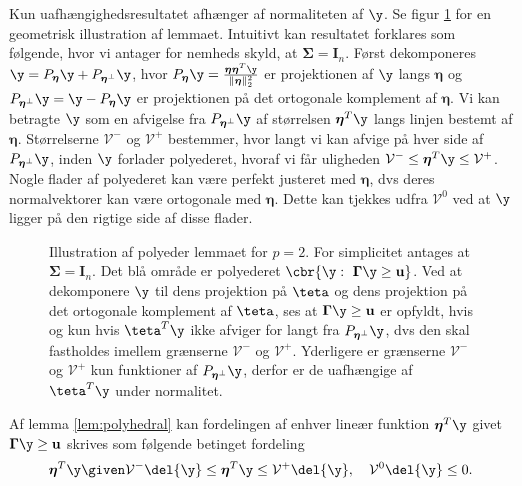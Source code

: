 Kun uafhængighedsresultatet afhænger af normaliteten af \(\y\).
Se figur \ref{fig:polyhedron} for en geometrisk illustration af lemmaet.
Intuitivt kan resultatet forklares som følgende, hvor vi antager for nemheds skyld, at \(\boldsymbol{\Sigma}= \mathbf{I}_n\).
Først dekomponeres \(\y=P_{\boldsymbol{\eta}} \y + P_{\boldsymbol{\eta}^\perp} \y\), hvor \(P_{\boldsymbol{\eta}} \y = \frac{\boldsymbol{\eta} \boldsymbol{\eta}^T \y}{\Vert \boldsymbol{\eta} \Vert_2^2}\) er projektionen af \(\y\) langs \(\boldsymbol{\eta}\) og \(P_{\boldsymbol{\eta}^\perp} \y = \y - P_{\boldsymbol{\eta}} \y\) er projektionen på det ortogonale komplement af \(\boldsymbol{\eta}\).
Vi kan betragte \(\y\) som en afvigelse fra \(P_{\boldsymbol{\eta}^\perp} \y\) af størrelsen \(\boldsymbol{\eta}^T \y\) langs linjen bestemt af \(\boldsymbol{\eta}\).
Størrelserne \(\mathcal{V}^-\) og \(\mathcal{V}^+\) bestemmer, hvor langt vi kan afvige på hver side af \(P_{\boldsymbol{\eta}^\perp} \y\), inden \(\y\) forlader polyederet, hvoraf vi får uligheden \(\mathcal{V}^- \leq \boldsymbol{\eta}^T \y \leq \mathcal{V}^+\).
Nogle flader af polyederet kan være perfekt justeret med \(\boldsymbol{\eta}\), dvs deres normalvektorer kan være ortogonale med \(\boldsymbol{\eta}\).
Dette kan tjekkes udfra \(\mathcal{V}^0\) ved at \(\y\) ligger på den rigtige side af disse flader.  
%
\begin{figure}[H]
\centering
\scalebox{1}{}
\caption{Illustration af polyeder lemmaet for \(p=2\). For simplicitet antages at \(\boldsymbol{\Sigma} = \mathbf{I}_n\). Det blå område er polyederet \(\cbr{\y : \ \boldsymbol{\Gamma} \y \geq \mathbf{u}}\).
Ved at dekomponere \(\y\) til dens projektion på \(\teta\) og dens projektion på det ortogonale komplement af \(\teta\), ses at \(\boldsymbol{\Gamma} \y \geq \mathbf{u}\) er opfyldt, hvis og kun hvis \(\teta^T \y\) ikke afviger for langt fra \(P_{\boldsymbol{\eta}^\perp} \y\), dvs den skal fastholdes imellem grænserne \(\mathcal{V}^-\) og \(\mathcal{V}^+\).
Yderligere er grænserne \(\mathcal{V}^-\) og \(\mathcal{V}^+\) kun funktioner af \(P_{\boldsymbol{\eta}^\perp} \y\), derfor er de uafhængige af \(\teta^T \y\) under normalitet.} \label{fig:polyhedron}
\end{figure}
%
Af lemma \ref{lem:polyhedral} kan fordelingen af enhver lineær funktion \(\boldsymbol{\eta}^T \y\) givet \(\boldsymbol{\Gamma} \y \geq \mathbf{u}\) skrives som følgende betinget fordeling
\begin{align*}
\boldsymbol{\eta}^T \y \given \mathcal{V}^- \del{\y} \leq \boldsymbol{\eta}^T \y \leq \mathcal{V}^+ \del{\y}, \quad \mathcal{V}^0 \del{\y} \leq 0.
\end{align*}
